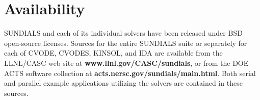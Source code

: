 \section{Availability}
\label{s:availability}

SUNDIALS and each of its individual solvers have been released 
under BSD open-source licenses.
Sources for the entire SUNDIALS suite or separately for each of CVODE, 
CVODES, KINSOL, and IDA are available from the LLNL/CASC web site at
\newline \hspace*{.5in} {\bf www.llnl.gov/CASC/sundials},
\newline or from the DOE ACTS software collection at
\newline \hspace*{.5in} {\bf acts.nersc.gov/sundials/main.html}.
\newline
Both serial and parallel example applications utilizing the solvers 
are contained in these sources. 






